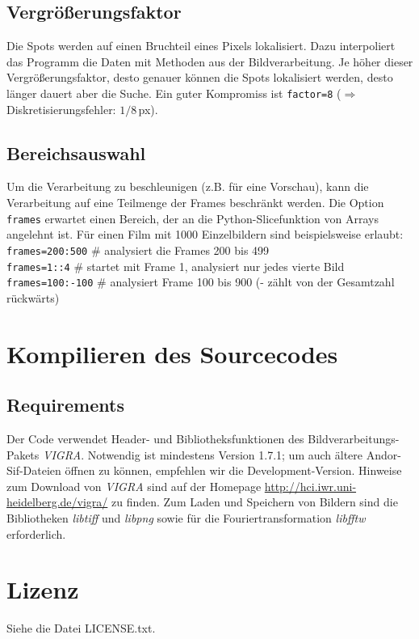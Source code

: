 \documentclass[DIV15,a4paper]{scrartcl}
\begin{document}
\subsection{Vergrößerungsfaktor}
Die Spots werden auf einen Bruchteil eines Pixels lokalisiert. Dazu interpoliert 
das Programm die Daten mit Methoden aus der Bildverarbeitung. Je höher dieser 
Vergrößerungsfaktor, desto genauer können die Spots lokalisiert werden, desto 
länger dauert aber die Suche. Ein guter Kompromiss ist \texttt{factor=8} 
($\Rightarrow$ Diskretisierungsfehler: $1/8$\,px).

\subsection{Bereichsauswahl}
Um die Verarbeitung zu beschleunigen (z.B. für eine Vorschau), kann die Verarbeitung auf 
eine Teilmenge der Frames beschränkt werden. Die Option \texttt{frames} erwartet
einen Bereich, der an die Python-Slicefunktion von Arrays angelehnt ist. 
Für einen Film mit 1000 Einzelbildern sind beispielsweise erlaubt:\\
\texttt{frames=200:500} \# analysiert die Frames 200 bis 499\\
\texttt{frames=1::4} \# startet mit Frame 1, analysiert nur jedes vierte Bild\\
\texttt{frames=100:-100} \# analysiert Frame 100 bis 900 (- zählt von der Gesamtzahl rückwärts) %


\section{Kompilieren des Sourcecodes}
\label{sec:Kompilieren}
\subsection{Requirements}
Der Code verwendet Header- und Bibliotheksfunktionen des Bildverarbeitungs-Pakets \emph{VIGRA}.
Notwendig ist mindestens Version 1.7.1; um auch ältere Andor-Sif-Dateien 
öffnen zu können, empfehlen wir die Development-Version. Hinweise zum Download 
von \emph{VIGRA} sind auf der Homepage \url{http://hci.iwr.uni-heidelberg.de/vigra/} zu finden.
Zum Laden und Speichern von Bildern sind die Bibliotheken \emph{libtiff} und \emph{libpng} sowie 
für die Fouriertransformation \emph{libfftw} erforderlich.


\section{Lizenz}
Siehe die Datei LICENSE.txt.
\end{document}
